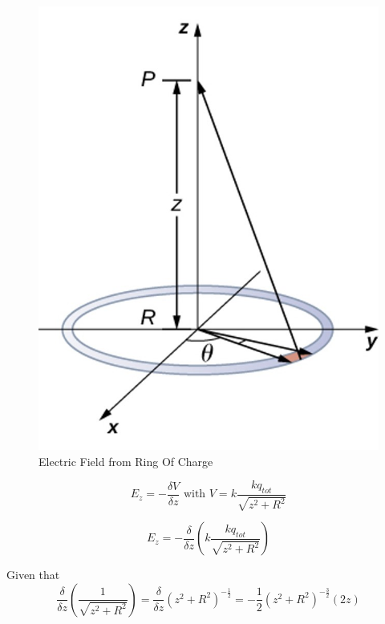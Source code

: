 \documentclass[14pt]{memoir}
\begin{document}
\begin{figure}[H]
\begin{center}
\includegraphics[scale=0.40]{fig/fig_07_29.jpg}
\caption{Electric Field from Ring Of Charge}
\label{fig:07_29}
\end{center}
\end{figure}

\begin{equation}
E_z = -\frac{\delta V}{\delta z} \text{ with } V = k\frac{k q_{tot}}{\sqrt{z^2+R^2}}
\end{equation}

\begin{equation}
E_z = -\frac{\delta}{\delta z} (k\frac{k q_{tot}}{\sqrt{z^2+R^2}})
\end{equation}

Given that
\begin{equation}
\frac{\delta}{\delta z} (\frac{1}{\sqrt{z^2+R^2}}) = \frac{\delta}{\delta z} (z^2+R^2)^{-\frac{1}{2}} = -\frac{1}{2} (z^2+R^2)^{-\frac{3}{2}} (2z)
\end{equation}
\end{document}
